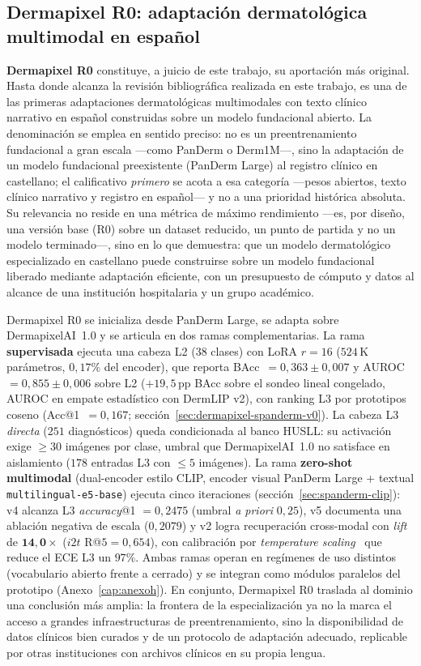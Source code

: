 \subsection{Dermapixel R0: adaptación dermatológica multimodal en
español}
\label{sec:linea-spanderm}

\textbf{Dermapixel R0} constituye, a juicio de este trabajo, su
aportación más original. Hasta donde alcanza la revisión bibliográfica
realizada en este trabajo, es una de las primeras adaptaciones
dermatológicas multimodales con texto clínico narrativo en español
construidas sobre un modelo fundacional abierto. La denominación se emplea
en sentido preciso: no es un preentrenamiento fundacional a gran escala
---como PanDerm o Derm1M---, sino la adaptación de un modelo fundacional
preexistente (PanDerm Large) al registro clínico en castellano; el
calificativo \emph{primero} se acota a esa categoría ---pesos abiertos,
texto clínico narrativo y registro en español--- y no a una prioridad
histórica absoluta. Su relevancia no reside en una métrica de máximo
rendimiento ---es, por diseño, una versión base (R0) sobre un dataset
reducido, un punto de partida y no un modelo terminado---, sino en lo que
demuestra: que un modelo dermatológico especializado en castellano puede
construirse sobre un modelo fundacional liberado mediante adaptación
eficiente, con un presupuesto de cómputo y datos al alcance de una
institución hospitalaria y un grupo académico.

Dermapixel R0 se inicializa desde PanDerm Large, se adapta sobre
DermapixelAI~1.0 y se articula en dos ramas complementarias. La rama
\textbf{supervisada} ejecuta una cabeza L2 ($38$ clases) con LoRA $r=16$
($524\,$K parámetros, $0{,}17\%$ del encoder), que reporta
BAcc~$=0{,}363 \pm 0{,}007$ y AUROC~$=0{,}855 \pm 0{,}006$ sobre L2
($+19{,}5$\,pp BAcc sobre el sondeo lineal congelado, AUROC en empate
estadístico con DermLIP v2), con ranking L3 por prototipos coseno
(Acc@1~$=0{,}167$; sección~\ref{sec:dermapixel-spanderm-v0}). La cabeza L3
\emph{directa} ($251$ diagnósticos) queda condicionada al banco HUSLL: su
activación exige $\geq 30$ imágenes por clase, umbral que DermapixelAI~1.0
no satisface en aislamiento ($178$ entradas L3 con $\leq 5$ imágenes). La
rama \textbf{zero-shot multimodal} (dual-encoder estilo CLIP, encoder
visual PanDerm Large + textual \texttt{multilingual-e5-base}) ejecuta
cinco iteraciones (sección~\ref{sec:spanderm-clip}): v4 alcanza L3
\emph{accuracy}@1 $=0{,}2475$ (umbral \emph{a priori} $0{,}25$), v5
documenta una ablación negativa de escala ($0{,}2079$) y v2 logra
recuperación cross-modal con \emph{lift} de $\mathbf{14{,}0\times}$
($i2t$ R@$5=0{,}654$), con calibración por \emph{temperature
scaling}~\cite{guo2017} que reduce el ECE L3 un $97\%$. Ambas ramas operan
en regímenes de uso distintos (vocabulario abierto frente a cerrado) y se
integran como módulos paralelos del prototipo (Anexo~\ref{cap:anexoh}). En
conjunto, Dermapixel R0 traslada al dominio una conclusión más amplia: la
frontera de la especialización ya no la marca el acceso a grandes
infraestructuras de preentrenamiento, sino la disponibilidad de datos
clínicos bien curados y de un protocolo de adaptación adecuado, replicable
por otras instituciones con archivos clínicos en su propia lengua.

